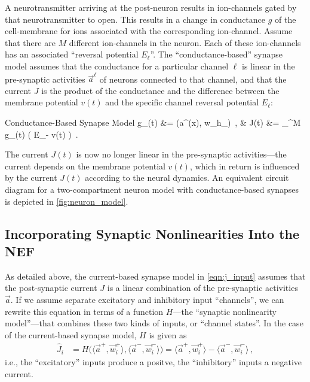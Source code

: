 \documentclass[10pt,letterpaper,oneside]{article}
\begin{document}
A neurotransmitter arriving at the post-neuron results in ion-channels gated by that neurotransmitter to open. This results in a change in conductance $g$ of the cell-membrane for ions associated with the corresponding ion-channel. Assume that there are $M$ different ion-channels in the neuron. Each of these ion-channels has an associated \enquote{reversal potential $E_\ell$}. The \enquote{conductance-based} synapse model assumes that the conductance for a particular channel $\ell$ is linear in the pre-synaptic activities $\vec a^\ell$ of neurons connected to that channel, and that the current $J$ is the product of the conductance and the difference between the membrane potential $v(t)$ and the specific channel reversal potential $E_\ell$:
\begin{ImportantEqn}{Conductance-Based Synapse Model}
	g_\ell(t) &= \big(\langle \vec a^\ell(\vec x), \vec w_\ell \rangle \ast h_\ell \big) \,, &
	J(t) &= \sum_{}^M g_\ell(t) \big( E_\ell - v(t) \big) \,.
\end{ImportantEqn}
The current $J(t)$ is now no longer linear in the pre-synaptic activities---the current depends on the membrane potential $v(t)$, which in return is influenced by the current $J(t)$ according to the neural dynamics. An equivalent circuit diagram for a two-compartment neuron model with conductance-based synapses is depicted in \cref{fig:neuron_model}.

\subsection{Incorporating Synaptic Nonlinearities Into the NEF}

As detailed above, the current-based synapse model in \cref{eqn:j_input} assumes that the post-synaptic current $J$ is a linear combination of the pre-synaptic activities $\vec a$. If we assume separate excitatory and inhibitory input \enquote{channels}, we can rewrite this equation in terms of a function $H$---the \enquote{synaptic nonlinearity model}---that combines these two kinds of inputs, or  \enquote{channel states}. In the case of the current-based synapse model, $H$ is given as
\begin{align}
	\hat J_i &= H\big(\langle \vec a^+, \vec w_i^+ \rangle, \langle \vec a^-, \vec w_i^- \rangle \big) = \langle \vec a^+, \vec w_i^+ \rangle - \langle \vec a^-, \vec w_i^- \rangle \,,
	\label{eqn:H_cur}
\end{align}
i.e., the \enquote{excitatory} inputs produce a positve, the \enquote{inhibitory} inputs a negative current.
\end{document}
